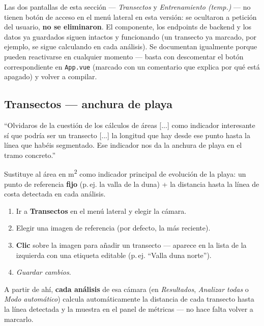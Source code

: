 \begin{warnbox}
Las dos pantallas de esta sección — \textit{Transectos} y \textit{Entrenamiento (temp.)} — no
tienen botón de acceso en el menú lateral en esta versión: se ocultaron a petición del usuario,
\textbf{no se eliminaron}. El componente, los endpoints de backend y los datos ya guardados
siguen intactos y funcionando (un transecto ya marcado, por ejemplo, se sigue calculando en cada
análisis). Se documentan igualmente porque pueden reactivarse en cualquier momento — basta con
descomentar el botón correspondiente en \texttt{App.vue} (marcado con un comentario que explica
por qué está apagado) y volver a compilar.
\end{warnbox}

\subsection{Transectos --- anchura de playa}
\label{sec:transectos}

\begin{infobox}
``Olvidaros de la cuestión de los cálculos de áreas [...] como indicador interesante sí que
podría ser un transecto [...] la longitud que hay desde ese punto hasta la línea que habéis
segmentado. Ese indicador nos da la anchura de playa en el tramo concreto.''
\end{infobox}

Sustituye al área en m\textsuperscript{2} como indicador principal de evolución de la playa: un
punto de referencia \textbf{fijo} (p.\,ej. la valla de la duna) + la distancia hasta la línea de
costa detectada en cada análisis.

\begin{enumerate}[leftmargin=1.5em]
  \item Ir a \textbf{Transectos} en el menú lateral y elegir la cámara.
  \item Elegir una imagen de referencia (por defecto, la más reciente).
  \item \textbf{Clic} sobre la imagen para añadir un transecto — aparece en la lista de la
        izquierda con una etiqueta editable (p.\,ej. ``Valla duna norte'').
  \item \textit{Guardar cambios}.
\end{enumerate}

A partir de ahí, \textbf{cada análisis} de esa cámara (en \textit{Resultados}, \textit{Analizar
todas} o \textit{Modo automático}) calcula automáticamente la distancia de cada transecto hasta
la línea detectada y la muestra en el panel de métricas — no hace falta volver a marcarlo.

